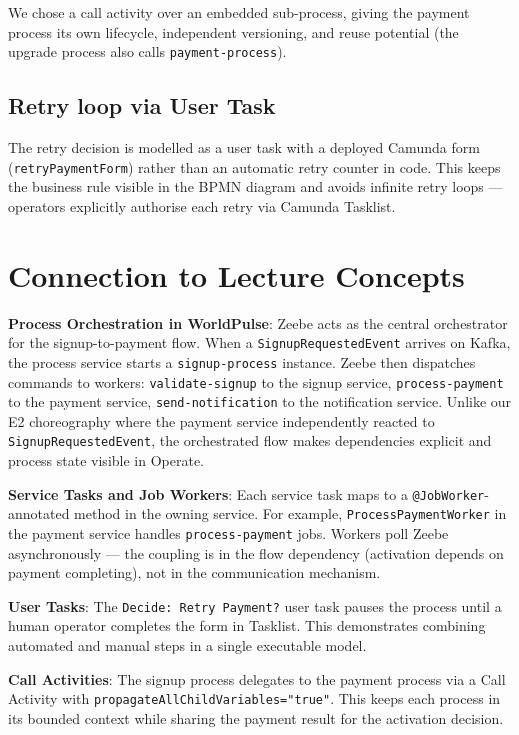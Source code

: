 \documentclass[10pt,a4paper]{article}
\begin{document}
We chose a call activity over an embedded sub-process, giving the payment process its own lifecycle, independent versioning, and reuse potential (the upgrade process also calls \texttt{payment-process}).

\subsection{Retry loop via User Task}

The retry decision is modelled as a user task with a deployed Camunda form (\texttt{retryPaymentForm}) rather than an automatic retry counter in code. This keeps the business rule visible in the BPMN diagram and avoids infinite retry loops --- operators explicitly authorise each retry via Camunda Tasklist.


\section{Connection to Lecture Concepts}

\textbf{Process Orchestration in WorldPulse}: Zeebe acts as the central orchestrator for the signup-to-payment flow. When a \texttt{SignupRequestedEvent} arrives on Kafka, the process service starts a \texttt{signup-process} instance. Zeebe then dispatches commands to workers: \texttt{validate-signup} to the signup service, \texttt{process-payment} to the payment service, \texttt{send-notification} to the notification service. Unlike our E2 choreography where the payment service independently reacted to \texttt{SignupRequestedEvent}, the orchestrated flow makes dependencies explicit and process state visible in Operate.

\textbf{Service Tasks and Job Workers}: Each service task maps to a \texttt{@JobWorker}-annotated method in the owning service. For example, \texttt{ProcessPaymentWorker} in the payment service handles \texttt{process-payment} jobs. Workers poll Zeebe asynchronously --- the coupling is in the flow dependency (activation depends on payment completing), not in the communication mechanism.

\textbf{User Tasks}: The \texttt{Decide: Retry Payment?} user task pauses the process until a human operator completes the form in Tasklist. This demonstrates combining automated and manual steps in a single executable model.

\textbf{Call Activities}: The signup process delegates to the payment process via a Call Activity with \texttt{propagateAllChildVariables="true"}. This keeps each process in its bounded context while sharing the payment result for the activation decision.
\end{document}
